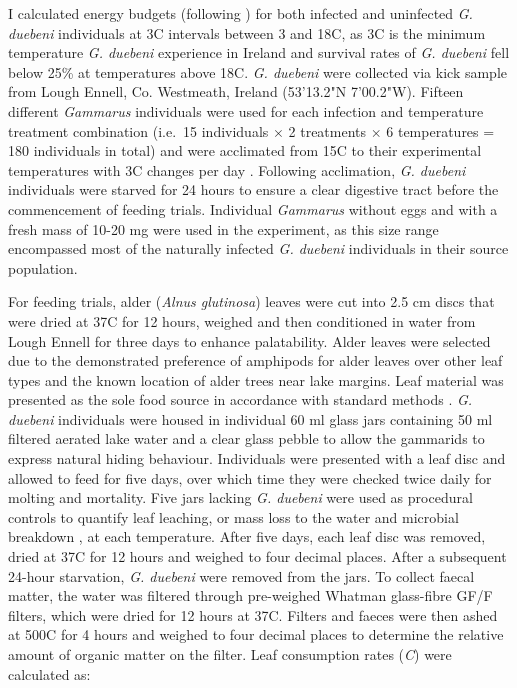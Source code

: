 I calculated energy budgets (following \citet{nilsson1974}) for both infected and uninfected \emph{G. duebeni} individuals at 3\degree C intervals between 3 and 18\degree C, as 3\degree C is the minimum temperature \emph{G. duebeni} experience in Ireland and survival rates of \emph{G. duebeni} fell below 25\% at temperatures above 18\degree C. \emph{G. duebeni} were collected via kick sample from Lough Ennell, Co. Westmeath, Ireland (53'13.2"N 7'00.2"W). Fifteen different \emph{Gammarus} individuals were used for each infection and temperature treatment combination (i.e.\ 15 individuals $\times$ 2 treatments $\times$ 6 temperatures = 180 individuals in total) and were acclimated from 15\degree C to their experimental temperatures with 3\degree C changes per day \citep{penk2016}. Following acclimation, \emph{G. duebeni} individuals were starved for 24 hours to ensure a clear digestive tract before the commencement of feeding trials. Individual \emph{Gammarus} without eggs and with a fresh mass of 10-20 mg were used in the experiment, as this size range encompassed most of the naturally infected \emph{G. duebeni} individuals in their source population.

For feeding trials, alder (\emph{Alnus glutinosa}) leaves were cut into 2.5 cm discs that were dried at 37\degree C for 12 hours, weighed and then conditioned in water from Lough Ennell for three days to enhance palatability. Alder leaves were selected due to the demonstrated preference of amphipods for alder leaves over other leaf types \citep{agatz2014} and the known location of alder trees near lake margins. Leaf material was presented as the sole food source in accordance with standard methods \citep{agatz2014}. \emph{G. duebeni} individuals were housed in individual 60 ml glass jars containing 50 ml filtered aerated lake water and a clear glass pebble to allow the gammarids to express natural hiding behaviour. Individuals were presented with a leaf disc and allowed to feed for five days, over which time they were checked twice daily for molting and mortality. Five jars lacking \emph{G. duebeni} were used as procedural controls to quantify leaf leaching, or mass loss to the water and microbial breakdown \citep{webster1986}, at each temperature. After five days, each leaf disc was removed, dried at 37\degree C for 12 hours and weighed to four decimal places. After a subsequent 24-hour starvation, \emph{G. duebeni} were removed from the jars. To collect faecal matter, the water was filtered through pre-weighed Whatman glass-fibre GF/F filters, which were dried for 12 hours at 37\degree C. Filters and faeces were then ashed at 500\degree C for 4 hours and weighed to four decimal places to determine the relative amount of organic matter on the filter.  Leaf consumption rates (\emph{C}) were calculated as:

